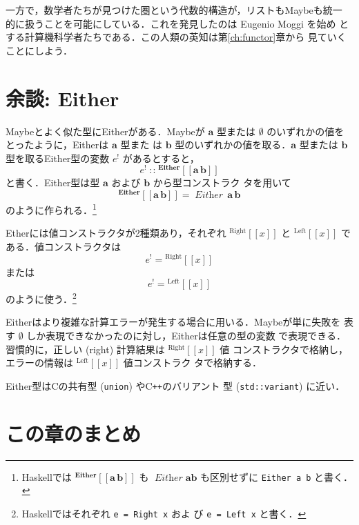\documentclass[a5paper,twoside,fleqn,draft]{jsbook}
\def\[{\left[\!\left[}
\def\]{\right]\!\right]}
\newcommand{\programminglanguage}[1]{\textsf{#1}}
\newcommand{\clang}{\programminglanguage{C}}
\newcommand{\cxx}{\programminglanguage{C}\texttt{++}}
\newcommand{\haskell}{\programminglanguage{Haskell}}
\newcommand{\code}[1]{\texttt{#1}}
\newcommand{\mNothing}{\emptyset}
\DeclareMathOperator{\mIn}{{:\!:}}
\newcommand{\mSpecialSub}[1]{\text{#1}}
\newcommand{\mLeft}{\mSpecialSub{Left}}
\newcommand{\mRight}{\mSpecialSub{Right}}
\newcommand{\mType}[1]{\mathbf{#1}}
\newcommand{\mGenericTypeAssembleII}[3]{{}^{\mType{#1}}\[\mType{#2}\,\mType{#3}\]}
\newcommand{\mEitherType}[2]{\mGenericTypeAssembleII{Either}{#1}{#2}}
\newcommand{\mTypeConstructor}[1]{\textit{#1}}
\DeclareMathOperator{\mEitherTypeConstructor}{\mTypeConstructor{Either}}
\newcommand{\mValueConstructor}[1]{\mathrm{#1}}
\newcommand{\mGenericValueAssemble}[2]{{}^\mValueConstructor{#1}\[#2\]}
\newcommand{\mLeftWith}[1]{\mGenericValueAssemble{\mLeft}{#1}}
\newcommand{\mRightWith}[1]{\mGenericValueAssemble{\mRight}{#1}}
\newcommand{\mEither}[1]{{#1}^!}
\begin{document}

一方で，数学者たちが見つけた圏という代数的構造が，リストもMaybeも統一
的に扱うことを可能にしている．これを発見したのは Eugenio Moggi を始め
とする計算機科学者たちである．この人類の英知は第\ref{ch:functor}章から
見ていくことにしよう．

\section{余談: Either}

Maybeとよく似た型にEitherがある．Maybeが $\mType{a}$ 型または
$\mNothing$ のいずれかの値をとったように，Eitherは $\mType{a}$ 型また
は $\mType{b}$ 型のいずれかの値を取る．$\mType{a}$ 型または
$\mType{b}$ 型を取るEither型の変数 $\mEither{e}$ があるとすると，
\begin{equation}
\mEither{e}\mIn{}\mEitherType{a}{b}
\end{equation}
と書く．Either型は型 $\mType{a}$ および $\mType{b}$ から型コンストラク
タを用いて
\begin{equation}
\mEitherType{a}{b}=\mEitherTypeConstructor\,\mType{a}\,\mType{b}
\end{equation}
のように作られる．\footnote{\haskell では $\mEitherType{a}{b}$ も
$\mEitherTypeConstructor\mType{a}\mType{b}$ も区別せずに
\code{Either a b} と書く．}

Etherには値コンストラクタが2種類あり，それぞれ $\mRightWith{x}$ と
$\mLeftWith{x}$ である．値コンストラクタは
\begin{equation}
\mEither{e}=\mRightWith{x}
\end{equation}
または
\begin{equation}
\mEither{e}=\mLeftWith{x}
\end{equation}
のように使う．\footnote{\haskell ではそれぞれ \code{e = Right x} およ
  び \code{e = Left x} と書く．}

Eitherはより複雑な計算エラーが発生する場合に用いる．Maybeが単に失敗を
表す $\mNothing$ しか表現できなかったのに対し，Eitherは任意の型の変数
で表現できる．習慣的に，正しい (right) 計算結果は $\mRightWith{x}$ 値
コンストラクタで格納し，エラーの情報は $\mLeftWith{x}$ 値コンストラク
タで格納する．

Either型は\clang の共有型 (\code{union}) や\cxx のバリアント
型 (\code{std::variant}) に近い．

\section{この章のまとめ}
\end{document}
